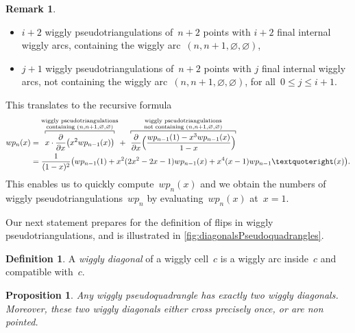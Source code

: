 \documentclass{amsart}
\newtheorem{proposition}[theorem]{Proposition}
\theoremstyle{definition}
\newtheorem{definition}[theorem]{Definition}
\newtheorem{remark}[theorem]{Remark}
\newcommand{\darkblue}{\color{darkblue}} %
\newcommand{\defn}[1]{\textsl{\darkblue #1}} %
\begin{document}
\begin{remark}
\begin{itemize}
\item $i+2$ wiggly pseudotriangulations of~$n+2$ points with $i+2$ final internal wiggly arcs, containing the wiggly arc~$(n, n+1, \varnothing, \varnothing)$,
\item $j+1$ wiggly pseudotriangulations of~$n+2$ points with $j$ final internal wiggly arcs, not containing the wiggly arc~$(n, n+1, \varnothing, \varnothing)$,  for all~$0 \le j \le i+1$.
\end{itemize}
\pagebreak
This translates to the recursive formula %
\begin{align*}
wp_{n}(x) & = \overbracket[.5pt]{x \cdot \frac{\partial}{\partial x} \big( x^2 wp_{n-1}(x) \big)}^{\substack{\text{wiggly pseudotriangulations} \\ \text{containing } (n, n+1, \varnothing, \varnothing)}} + \overbracket[.5pt]{\frac{\partial}{\partial x}\Big( \smash{\frac{wp_{n-1}(1)-x^3wp_{n-1}(x)}{1-x}} \Big)}^{\substack{\qquad\; \text{wiggly pseudotriangulations} \qquad\;  \\ \text{not containing } (n, n+1, \varnothing, \varnothing)}} \\
& = \frac{1}{(1 - x)^2} \big( wp_{n-1}(1) + x^2 (2 x^2 - 2 x - 1) wp_{n-1}(x) + x^4 (x - 1) wp_{n-1}’(x) \big).
\end{align*}
This enables us to quickly compute~$wp_n(x)$ and we obtain the numbers of wiggly pseudotriangulations~$wp_n$ by evaluating~$wp_n(x)$ at~$x = 1$.
\end{remark}

Our next statement prepares for the definition of flips in wiggly pseudotriangulations, and is illustrated in \cref{fig:diagonalsPseudoquadrangles}.

\begin{definition}
A \defn{wiggly diagonal} of a wiggly cell~$c$ is a wiggly arc inside~$c$ and compatible with~$c$.
\end{definition}

\begin{proposition}
\label{prop:diagonalsPseudoquadrangle}
Any wiggly pseudoquadrangle has exactly two wiggly diagonals.
Moreover, these two wiggly diagonals either cross precisely once, or are non pointed.
\end{proposition}
\end{document}
